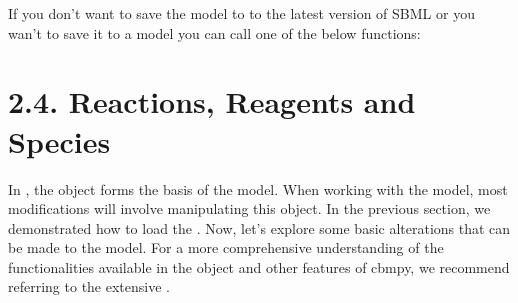 \documentclass[letterpaper,10pt,english]{sphinxmanual}
\begin{document}
\begin{sphinxVerbatim}[commandchars=\\\{\}]
   
 

  
\end{sphinxVerbatim}

\sphinxAtStartPar
If you don’t want to save the model to to the latest version of SBML or you wan’t to save it to a  model you can call one of the below functions:

\begin{sphinxVerbatim}[commandchars=\\\{\}]
\end{sphinxVerbatim}


\section{2.4. Reactions, Reagents and Species}
\label{\detokenize{2_getting_started/home:reactions-reagents-and-species}}
\sphinxAtStartPar
In , the  object forms the basis of the model. When working with the model,
most modifications will involve manipulating this object. In the previous section,
we demonstrated how to load the . Now, let’s explore some basic alterations that can be made
to the model. For a more comprehensive understanding of the functionalities available in the  object and
other features of cbmpy, we recommend referring to the extensive .
\end{document}
